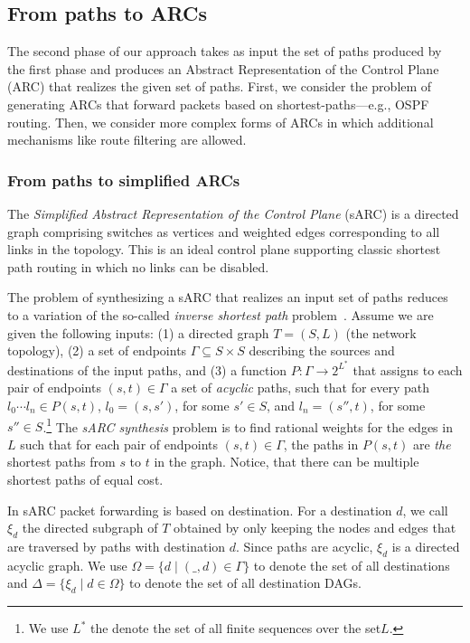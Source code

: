

\subsection{From paths to ARCs}

The second phase of our approach takes as input the set of paths produced by the first phase
and produces an Abstract Representation of the Control Plane (ARC) that realizes the given set of paths.
First, we  consider the problem of generating ARCs that
 forward packets based on shortest-paths---e.g., OSPF routing.
Then, we consider more complex forms of ARCs in which 
 additional mechanisms like route filtering are allowed. 
 
\subsubsection{From paths to simplified ARCs}
The \emph{Simplified Abstract Representation of the Control Plane} (sARC) is a directed graph comprising switches as 
vertices and weighted edges corresponding to all links in the
topology. 
This is an ideal control plane supporting classic shortest path routing in which no links can be disabled. 

The problem of synthesizing 
a sARC that realizes an input set of paths reduces to a
variation of the so-called {\em inverse shortest path} problem~\cite{}. 
Assume we are given the following inputs: (1) a directed graph $T = (S, L)$ (the network topology), 
(2) a set of endpoints $\Gamma \subseteq S\times S$
describing the sources and destinations of the input paths, and 
(3) a function $P: \Gamma \rightarrow 2^{L^*}$
that assigns to each pair of endpoints $(s,t) \in \Gamma$ 
a set of \emph{acyclic} paths, such that for every path $l_0\cdots l_n\in P(s,t)$,
$l_0=(s,s')$, for some $s'\in S$, and $l_n=(s'',t)$, for some $s''\in S$.\footnote{
We use $L^*$ the denote the set of all finite sequences over the set$L$.}
The 
\emph{sARC synthesis}
problem is to find rational weights for the edges in $L$ such that 
for each pair of endpoints $(s,t) \in \Gamma$, 
the paths in $P(s,t)$ are \emph{the} shortest paths from $s$ to $t$ 
in the graph. Notice, that there can be multiple shortest
paths of equal cost.

In sARC packet forwarding is based on destination.
For a destination $d$, we call $\xi_d$ the directed
subgraph of $T$ obtained by only keeping the nodes and edges 
that are traversed by paths with destination $d$.
Since paths are acyclic, $\xi_d$ is a directed acyclic graph.
We use $\Omega=\{d\mid (\_,d)\in\Gamma\}$ to denote the 
set of all destinations and $\Delta=\{\xi_d\mid d\in \Omega\}$ to denote  
the set of all destination DAGs. 

